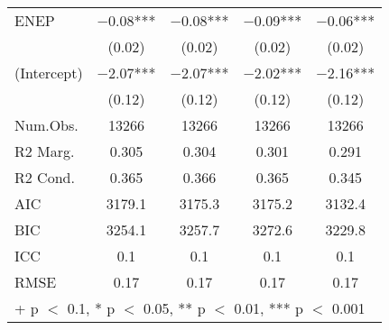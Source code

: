 \begin{table}
\begin{tabular}[t]{lcccc}
ENEP & \num{-0.08}*** & \num{-0.08}*** & \num{-0.09}*** & \num{-0.06}***\\
 & (\num{0.02}) & (\num{0.02}) & (\num{0.02}) & (\num{0.02})\\
(Intercept) & \num{-2.07}*** & \num{-2.07}*** & \num{-2.02}*** & \num{-2.16}***\\
 & (\num{0.12}) & (\num{0.12}) & (\num{0.12}) & (\num{0.12})\\
\midrule
Num.Obs. & \num{13266} & \num{13266} & \num{13266} & \num{13266}\\
R2 Marg. & \num{0.305} & \num{0.304} & \num{0.301} & \num{0.291}\\
R2 Cond. & \num{0.365} & \num{0.366} & \num{0.365} & \num{0.345}\\
AIC & \num{3179.1} & \num{3175.3} & \num{3175.2} & \num{3132.4}\\
BIC & \num{3254.1} & \num{3257.7} & \num{3272.6} & \num{3229.8}\\
ICC & \num{0.1} & \num{0.1} & \num{0.1} & \num{0.1}\\
RMSE & \num{0.17} & \num{0.17} & \num{0.17} & \num{0.17}\\
\bottomrule
\multicolumn{5}{l}{\rule{0pt}{1em}+ p $<$ 0.1, * p $<$ 0.05, ** p $<$ 0.01, *** p $<$ 0.001}\\
\end{tabular}
\end{table}
